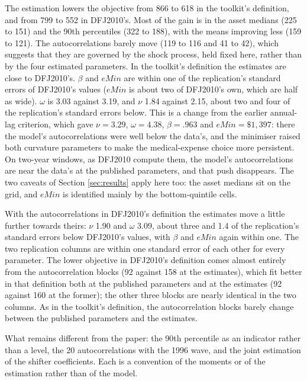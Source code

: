 \documentclass[11pt,fleqn]{article}
\begin{document}
The estimation lowers the objective from 866 to 618 in the toolkit's definition, and from 799 to 552 in DFJ2010's. Most of the gain is in the asset medians (225 to 151) and the 90th percentiles (322 to 188), with the means improving less (159 to 121). The autocorrelations barely move (119 to 116 and 41 to 42), which suggests that they are governed by the shock process, held fixed here, rather than by the four estimated parameters. In the toolkit's definition the estimates are close to DFJ2010's. $\beta$ and $eMin$ are within one of the replication's standard errors of DFJ2010's values ($eMin$ is about two of DFJ2010's own, which are half as wide). $\omega$ is 3.03 against 3.19, and $\nu$ 1.84 against 2.15, about two and four of the replication's standard errors below. This is a change from the earlier annual-lag criterion, which gave $\nu=3.29$, $\omega=4.38$, $\beta=.963$ and $eMin=\$1{,}397$: there the model's autocorrelations were well below the data's, and the minimiser raised both curvature parameters to make the medical-expense choice more persistent. On two-year windows, as DFJ2010 compute them, the model's autocorrelations are near the data's at the published parameters, and that push disappears. The two caveats of Section \ref{sec:results} apply here too: the asset medians sit on the grid, and $eMin$ is identified mainly by the bottom-quintile cells.

With the autocorrelations in DFJ2010's definition the estimates move a little further towards theirs: $\nu$ 1.90 and $\omega$ 3.09, about three and 1.4 of the replication's standard errors below DFJ2010's values, with $\beta$ and $eMin$ again within one. The two replication columns are within one standard error of each other for every parameter. The lower objective in DFJ2010's definition comes almost entirely from the autocorrelation blocks (92 against 158 at the estimates), which fit better in that definition both at the published parameters and at the estimates (92 against 160 at the former); the other three blocks are nearly identical in the two columns. As in the toolkit's definition, the autocorrelation blocks barely change between the published parameters and the estimates.

What remains different from the paper: the 90th percentile as an indicator rather than a level, the 20 autocorrelations with the 1996 wave, and the joint estimation of the shifter coefficients. Each is a convention of the moments or of the estimation rather than of the model.
\end{document}
